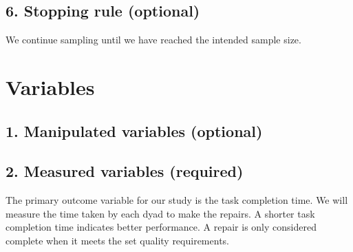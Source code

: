 \documentclass[A4,11pt]{article}
\renewcommand{\~}[1]{\tilde{#1}}
\renewcommand{\-}[1]{\overline{#1}}
\begin{document}
\subsection*{6. Stopping rule (optional)}
We continue sampling until we have reached the intended sample size.

\newpage

\section*{Variables}

\subsection*{1. Manipulated variables (optional)}

\subsection*{2. Measured variables (required) }


The primary outcome variable for our study is the task completion time. We will measure the time taken by each dyad to make the repairs.  A shorter task completion time indicates better performance. A repair is only considered complete when it meets the set quality requirements. 
\end{document}
